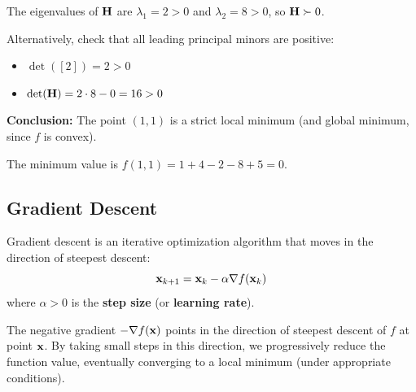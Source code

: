 \begin{examplebox}[title=Example: Finding the Minimum of a Quadratic Function]
The eigenvalues of $\mathbf{H}$ are $\lambda_1 = 2 > 0$ and $\lambda_2 = 8 > 0$, so $\mathbf{H} \succ 0$.

Alternatively, check that all leading principal minors are positive:
\begin{itemize}
    \item $\det([2]) = 2 > 0$
    \item $\det(\mathbf{H}) = 2 \cdot 8 - 0 = 16 > 0$
\end{itemize}

\textbf{Conclusion:} The point $(1, 1)$ is a strict local minimum (and global minimum, since $f$ is convex).

The minimum value is $f(1, 1) = 1 + 4 - 2 - 8 + 5 = 0$.
\end{examplebox}

\subsection{Gradient Descent}

Gradient descent is an iterative optimization algorithm that moves in the direction of steepest descent:
\begin{equation}
\mathbf{x}_{k+1} = \mathbf{x}_k - \alpha \nabla f(\mathbf{x}_k)
\end{equation}
where $\alpha > 0$ is the \textbf{step size} (or \textbf{learning rate}).



\begin{keyconceptbox}[title=Intuition Behind Gradient Descent]
The negative gradient $-\nabla f(\mathbf{x})$ points in the direction of steepest descent of $f$ at point $\mathbf{x}$. By taking small steps in this direction, we progressively reduce the function value, eventually converging to a local minimum (under appropriate conditions).
\end{keyconceptbox}




